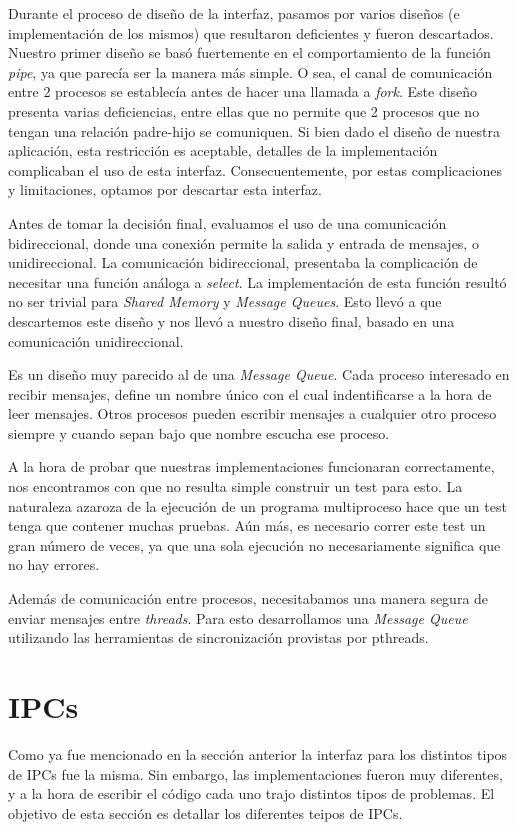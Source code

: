 \documentclass[a4paper,10pt]{article}
\begin{document}
Durante el proceso de diseño de la interfaz, pasamos por varios diseños (e implementación de los mismos) que resultaron deficientes y fueron descartados.
Nuestro primer diseño se basó fuertemente en el comportamiento de la función \textit{pipe}, ya que parecía ser la manera más simple.
O sea, el canal de comunicación entre 2 procesos se establecía antes de hacer una llamada a \textit{fork}.
Este diseño presenta varias deficiencias, entre ellas que no permite que 2 procesos que no tengan una relación padre-hijo se comuniquen.
Si bien dado el diseño de nuestra aplicación, esta restricción es aceptable, detalles de la implementación complicaban el uso de esta interfaz.
Consecuentemente, por estas complicaciones y limitaciones, optamos por descartar esta interfaz.

Antes de tomar la decisión final, evaluamos el uso de una comunicación bidireccional, donde una conexión permite la salida y entrada de mensajes, o unidireccional.
La comunicación bidireccional, presentaba la complicación de necesitar una función análoga a \textit{select}.
La implementación de esta función resultó no ser trivial para \textit{Shared Memory} y \textit{Message Queues}.
Esto llevó a que descartemos este diseño y nos llevó a nuestro diseño final, basado en una comunicación unidireccional.

Es un diseño muy parecido al de una \textit{Message Queue}.
Cada proceso interesado en recibir mensajes, define un nombre único con el cual indentificarse a la hora de leer mensajes.
Otros procesos pueden escribir mensajes a cualquier otro proceso siempre y cuando sepan bajo que nombre escucha ese proceso.

A la hora de probar que nuestras implementaciones funcionaran correctamente, nos encontramos con que no resulta simple construir un test para esto.
La naturaleza azaroza de la ejecución de un programa multiproceso hace que un test tenga que contener muchas pruebas.
Aún más, es necesario correr este test un gran número de veces, ya que una sola ejecución no necesariamente significa que no hay errores.

Además de comunicación entre procesos, necesitabamos una manera segura de enviar mensajes entre \textit{threads}.
Para esto desarrollamos una \textit{Message Queue} utilizando las herramientas de sincronización provistas por pthreads.

\newpage
\section{IPCs}
Como ya fue mencionado en la sección anterior la interfaz para los distintos tipos de IPCs fue la misma.
Sin embargo, las implementaciones fueron muy diferentes, y a la hora de escribir el código cada uno trajo
distintos tipos de problemas. El objetivo de esta sección es detallar los diferentes teipos de IPCs.
\end{document}
